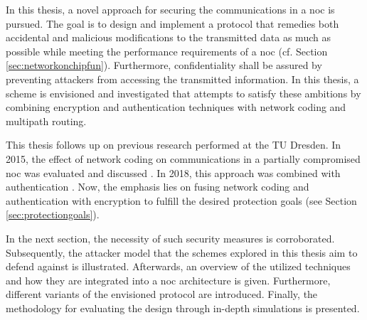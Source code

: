 In this thesis, a novel approach for securing the communications in a \gls{noc} is pursued. The goal is to design and implement a protocol that
remedies both accidental and malicious modifications to the transmitted data as much as possible while meeting the performance requirements of a \gls{noc} (cf. Section
\ref{sec:networkonchipfun}). Furthermore, confidentiality shall be assured by preventing attackers from accessing the transmitted information. In this
thesis, a scheme is envisioned and investigated that attempts to satisfy these ambitions by combining encryption and authentication techniques with
network coding and multipath routing.

This thesis follows up on previous research performed at the TU Dresden. In 2015, the effect of network coding on communications in a partially
compromised \gls{noc} was evaluated and discussed \cite{moriam15manycorenc}. In 2018, this approach was combined with authentication
\cite{moriam18activeattackers}. Now, the emphasis lies on fusing network coding and authentication with encryption to fulfill the desired protection
goals (see Section \ref{sec:protectiongoals}).

In the next section, the necessity of such security measures is corroborated. Subsequently, the attacker model that the schemes explored in this
thesis aim to defend against is illustrated. Afterwards, an overview of the utilized techniques and how they are
integrated into a \gls{noc} architecture is given. Furthermore, different variants of the envisioned protocol are introduced. Finally, the
methodology for evaluating the design through in-depth simulations is presented.

